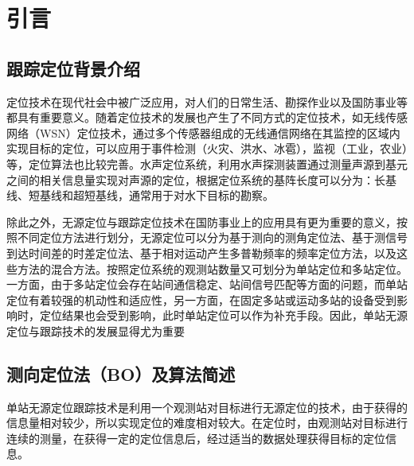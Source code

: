 %
%
%
%
%
%

\chapter{引言}

\section{跟踪定位背景介绍}
定位技术在现代社会中被广泛应用，对人们的日常生活、勘探作业以及国防事业等都具有重要意义。随着定位技术的发展也产生了不同方式的定位技术，如无线传感网络（WSN）定位技术\cite{wls1}\cite{wls2}\cite{wsl3}\cite{wsl4}，通过多个传感器组成的无线通信网络在其监控的区域内实现目标的定位，可以应用于事件检测（火灾、洪水、冰雹），监视（工业，农业）等，定位算法也比较完善。水声定位系统\cite{bls5}\cite{bls6}\cite{bls7}\cite{bls8}，利用水声探测装置通过测量声源到基元之间的相关信息量实现对声源的定位，根据定位系统的基阵长度可以分为：长基线、短基线和超短基线，通常用于对水下目标的勘察。

除此之外，无源定位与跟踪定位技术在国防事业上的应用具有更为重要的意义\cite{9}，按照不同定位方法进行划分，无源定位可以分为基于测向的测角定位法、基于测信号到达时间差的时差定位法、基于相对运动产生多普勒频率的频率定位方法，以及这些方法的混合方法。按照定位系统的观测站数量又可划分为单站定位和多站定位。一方面，由于多站定位会存在站间通信稳定、站间信号匹配等方面的问题，而单站定位有着较强的机动性和适应性，另一方面，在固定多站或运动多站的设备受到影响时，定位结果也会受到影响，此时单站定位可以作为补充手段。因此，单站无源定位与跟踪技术的发展显得尤为重要
\section{测向定位法（BO）及算法简述}
单站无源定位跟踪技术是利用一个观测站对目标进行无源定位的技术，由于获得的信息量相对较少，所以实现定位的难度相对较大。在定位时，由观测站对目标进行连续的测量，在获得一定的定位信息后，经过适当的数据处理获得目标的定位信息。

